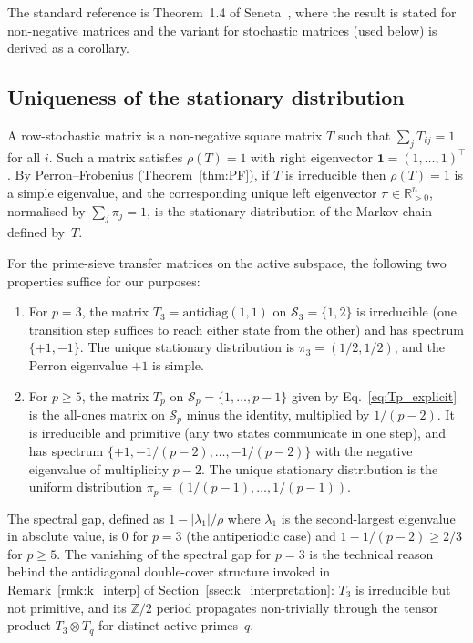 The standard reference is Theorem~1.4 of
Seneta~\cite{Seneta2006}, where the result is stated for
non-negative matrices and the variant for stochastic matrices
(used below) is derived as a corollary.

\subsection{Uniqueness of the stationary distribution}
\label{appssec:uniqueness}

A row-stochastic matrix is a non-negative square matrix $T$ such
that $\sum_j T_{ij} = 1$ for all $i$. Such a matrix satisfies
$\rho(T) = 1$ with right eigenvector $\mathbf{1} = (1, \ldots, 1)^\top$.
By Perron--Frobenius (Theorem~\ref{thm:PF}), if $T$ is irreducible
then $\rho(T) = 1$ is a simple eigenvalue, and the corresponding
unique left eigenvector $\pi \in \mathbb{R}_{> 0}^n$, normalised by
$\sum_j \pi_j = 1$, is the stationary distribution of the Markov
chain defined by~$T$.

For the prime-sieve transfer matrices on the active subspace, the
following two properties suffice for our purposes:
\begin{enumerate}[itemsep=2pt]
  \item For $p = 3$, the matrix $T_3 = \mathrm{antidiag}(1, 1)$ on
    $\mathcal{S}_3 = \{1, 2\}$ is irreducible (one transition step
    suffices to reach either state from the other) and has spectrum
    $\{+1, -1\}$. The unique stationary distribution is
    $\pi_3 = (1/2, 1/2)$, and the Perron eigenvalue $+1$ is simple.
  \item For $p \geq 5$, the matrix $T_p$ on
    $\mathcal{S}_p = \{1, \ldots, p-1\}$ given by
    Eq.~\eqref{eq:Tp_explicit} is the all-ones matrix on
    $\mathcal{S}_p$ minus the identity, multiplied by $1/(p-2)$.
    It is irreducible and primitive (any two states communicate in
    one step), and has spectrum
    $\{+1, -1/(p-2), \ldots, -1/(p-2)\}$ with the negative
    eigenvalue of multiplicity $p - 2$. The unique stationary
    distribution is the uniform distribution
    $\pi_p = (1/(p-1), \ldots, 1/(p-1))$.
\end{enumerate}
The spectral gap, defined as $1 - |\lambda_1|/\rho$ where
$\lambda_1$ is the second-largest eigenvalue in absolute value, is
$0$ for $p = 3$ (the antiperiodic case) and
$1 - 1/(p-2) \geq 2/3$ for $p \geq 5$. The vanishing of the
spectral gap for $p = 3$ is the technical reason behind the
antidiagonal double-cover structure invoked in
Remark~\ref{rmk:k_interp} of Section~\ref{ssec:k_interpretation}:
$T_3$ is irreducible but not primitive, and its $\mathbb{Z}/2$
period propagates non-trivially through the tensor product
$T_3 \otimes T_q$ for distinct active primes~$q$.

